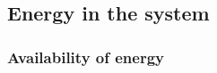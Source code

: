 \newcommand{\formalAgentEnergyAvailable}[2]{
	\functionFormal{fae}
	{\setAgents{}{}}
	{\setRealNumbersUnit{}{}}
}
\newcommand{\functionAgentEnergyAvailable}[2]{
	\functionSignature{fae_{\varTime{}{}}}
	{\varAgent{}{}}
}


\subsection{Energy in the system}
\newcommand{\functionEnergyVariability}[2]{
\ifx \\#1\\
	\functionSignature{ev_{\varTime{}{}}}
	{\setAgents{}{}}
\else
	\functionSignature{ev_{\varTime{}{}}}{#1}
\fi
}
\newcommand{\functionEnergyInverseVariability}[2]{
	\ifx \\#1\\
	\functionSignature{eiv_{\varTime{}{}}}
	{\setAgents{}{}}
	\else
	\functionSignature{eiv_{\varTime{}{}}}{#1}
	\fi
}
\newcommand{\functionFractionalEnergyAvailable}[2]{
\ifx \\#1\\
	\functionSignature{fea_{\varTime{}{}}}{\setAgents{}{}}
\else
	\functionSignature{fea_{\varTime{}{}}}{#1}
\fi
}
\subsubsection{Availability of energy}

